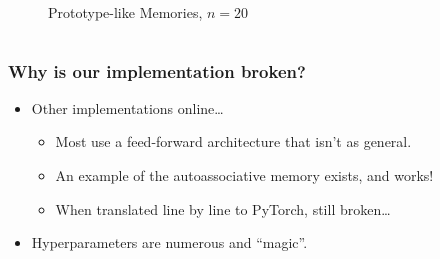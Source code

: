 \begin{frame}
\begin{columns}
\begin{figure}
    \caption{Prototype-like Memories, \(n=20\)}
    \end{figure}
    
\end{columns}

\end{frame}


\begin{frame}
    \frametitle{Why is our implementation broken?}

    \begin{itemize}
        \item Other implementations online\dots
        \begin{itemize}
            \item Most use a feed-forward architecture that isn't as general.
            \item An example of the autoassociative memory exists, and works!
            \item When translated line by line to PyTorch, still broken\dots
        \end{itemize}
        \item Hyperparameters are numerous and ``magic''.
    \end{itemize}
\end{frame}